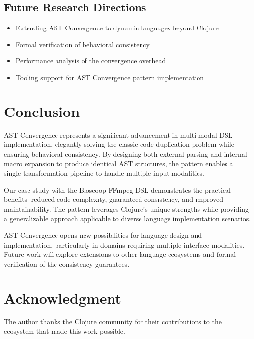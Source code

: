 \documentclass[conference]{IEEEtran}
\begin{document}
\subsection{Future Research Directions}

\begin{itemize}
\item Extending AST Convergence to dynamic languages beyond Clojure
\item Formal verification of behavioral consistency
\item Performance analysis of the convergence overhead
\item Tooling support for AST Convergence pattern implementation
\end{itemize}

\section{Conclusion}

AST Convergence represents a significant advancement in multi-modal DSL implementation, elegantly solving the classic code duplication problem while ensuring behavioral consistency. By designing both external parsing and internal macro expansion to produce identical AST structures, the pattern enables a single transformation pipeline to handle multiple input modalities.

Our case study with the Bioscoop FFmpeg DSL demonstrates the practical benefits: reduced code complexity, guaranteed consistency, and improved maintainability. The pattern leverages Clojure's unique strengths while providing a generalizable approach applicable to diverse language implementation scenarios.

AST Convergence opens new possibilities for language design and implementation, particularly in domains requiring multiple interface modalities. Future work will explore extensions to other language ecosystems and formal verification of the consistency guarantees.

\section*{Acknowledgment}

The author thanks the Clojure community for their contributions to the ecosystem that made this work possible.



\end{document}
